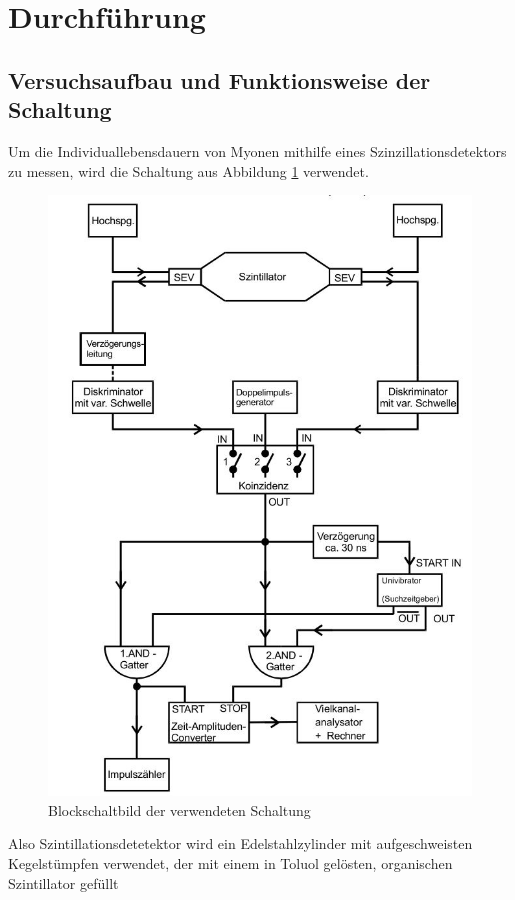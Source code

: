 \section{Durchführung}
\label{sec:Durchführung}
\subsection{Versuchsaufbau und Funktionsweise der Schaltung}
\label{sub:aufbau}
Um die Individuallebensdauern von Myonen mithilfe eines Szinzillationsdetektors zu messen, wird die Schaltung aus Abbildung \ref{fig:schaltung} verwendet.
\begin{figure}[H]
  \centering
  \includegraphics{./content/blockschaltbild.JPG}
  \caption{Blockschaltbild der verwendeten Schaltung \cite{Anleitung}}
  \label{fig:schaltung}
\end{figure}
Also Szintillationsdetetektor wird ein Edelstahlzylinder mit aufgeschweisten Kegelstümpfen verwendet, der mit einem in Toluol gelösten, organischen Szintillator gefüllt
